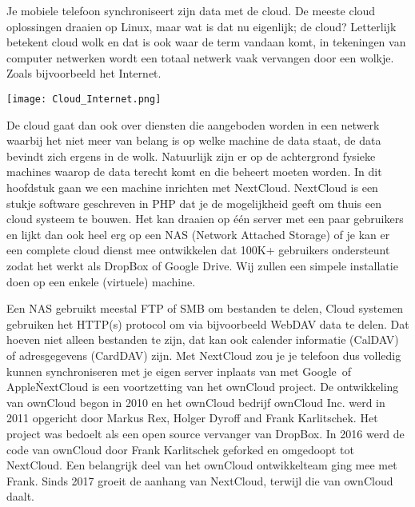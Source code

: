 Je mobiele telefoon synchroniseert zijn data met de cloud. De meeste cloud oplossingen draaien op Linux, maar wat is dat nu eigenlijk; de cloud? Letterlijk betekent cloud wolk en dat is ook waar de term vandaan komt, in tekeningen van computer netwerken wordt een totaal netwerk vaak vervangen door een wolkje. Zoals bijvoorbeeld het Internet.

\texttt{[image: Cloud\_Internet.png]}%

De cloud gaat dan ook over diensten die aangeboden worden in een netwerk waarbij het niet meer van belang is op welke machine de data staat, de data bevindt zich ergens in de wolk. Natuurlijk zijn er op de achtergrond fysieke machines waarop de data terecht komt en die beheert moeten worden. In dit hoofdstuk gaan we een machine inrichten met NextCloud. NextCloud is een stukje software geschreven in PHP dat je de mogelijkheid geeft om thuis een cloud systeem te bouwen. Het kan draaien op \'e\'en server met een paar gebruikers en lijkt dan ook heel erg op een NAS (Network Attached Storage) of je kan er een complete cloud dienst mee ontwikkelen dat 100K+ gebruikers ondersteunt zodat het werkt als DropBox of Google Drive. Wij zullen een simpele installatie doen op een enkele (virtuele) machine.

Een NAS gebruikt meestal FTP of SMB om bestanden te delen, Cloud systemen gebruiken het HTTP(s) protocol om via bijvoorbeeld WebDAV data te delen. Dat hoeven niet alleen bestanden te zijn, dat kan ook calender informatie (CalDAV) of adresgegevens (CardDAV) zijn. Met NextCloud zou je je telefoon dus volledig kunnen synchroniseren met je eigen server inplaats van met Google\texttrademark\ of Apple\texttrademark\.

NextCloud is een voortzetting van het ownCloud project. De ontwikkeling van ownCloud begon in 2010 en het ownCloud bedrijf ownCloud Inc. werd in 2011 opgericht door Markus Rex, Holger Dyroff and Frank Karlitschek. Het project was bedoelt als een open source vervanger van DropBox. In 2016 werd de code van ownCloud door Frank Karlitschek geforked en omgedoopt tot NextCloud. Een belangrijk deel van het ownCloud ontwikkelteam ging mee met Frank. Sinds 2017 groeit de aanhang van NextCloud, terwijl die van ownCloud daalt.

